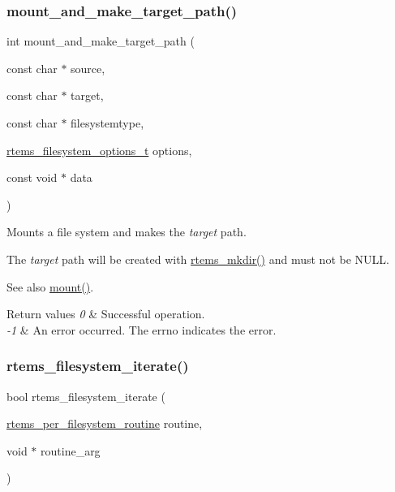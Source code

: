 \subsubsection{\texorpdfstring{mount\_and\_make\_target\_path()}{mount\_and\_make\_target\_path()}}
{\footnotesize\ttfamily int mount\+\_\+and\+\_\+make\+\_\+target\+\_\+path (\begin{DoxyParamCaption}\item[{const char $\ast$}]{source,  }\item[{const char $\ast$}]{target,  }\item[{const char $\ast$}]{filesystemtype,  }\item[{\mbox{\hyperlink{group__FileSystemTypesAndMount_gabb3a23ee6b6e7aacb719a1a81716af7a}{rtems\+\_\+filesystem\+\_\+options\+\_\+t}}}]{options,  }\item[{const void $\ast$}]{data }\end{DoxyParamCaption})}



Mounts a file system and makes the {\itshape target} path. 

The {\itshape target} path will be created with \mbox{\hyperlink{group__LibIO_gad15bb6c81ba9ed35ec75103d13bde734}{rtems\+\_\+mkdir()}} and must not be {\ttfamily N\+U\+LL}.

\begin{DoxySeeAlso}{See also}
\mbox{\hyperlink{group__FileSystemTypesAndMount_gaf3c1bed49bb0f3dec88d330b4f88d48b}{mount()}}.
\end{DoxySeeAlso}

\begin{DoxyRetVals}{Return values}
{\em 0} & Successful operation. \\
\hline
{\em -\/1} & An error occurred. The {\ttfamily errno} indicates the error. \\
\hline
\end{DoxyRetVals}
\mbox{\label{group__FileSystemTypesAndMount_ga27b530006418803c3888d8bfd1c3949a}} 
\subsubsection{\texorpdfstring{rtems\_filesystem\_iterate()}{rtems\_filesystem\_iterate()}}
{\footnotesize\ttfamily bool rtems\+\_\+filesystem\+\_\+iterate (\begin{DoxyParamCaption}\item[{\mbox{\hyperlink{group__FileSystemTypesAndMount_gaa40c0b8e4e5abe60a08bead5b3c72241}{rtems\+\_\+per\+\_\+filesystem\+\_\+routine}}}]{routine,  }\item[{void $\ast$}]{routine\+\_\+arg }\end{DoxyParamCaption})}




